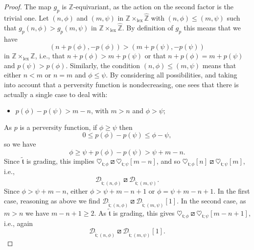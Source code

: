 \documentclass{article}
\newtheorem{prop}[thm]{Proposition}
\theoremstyle{definition}
\newcommand{\Z}{\mathbb{Z}}
\newcommand{\tee}{\mathfrak{t}}
\newcommand{\orth}{\boxslash}
\begin{document}
\begin{proof}
The map $g_p$ is $\Z$-equivariant, as the action on the second factor is the trivial one.  Let $(n,\phi)$ and $(m,\psi)$ in $\Z\times_{\mathrm{lex}} \hat{\Z}$ with $(n,\phi)\leq (m,\psi)$ such that $g_p(n,\phi)>g_p(m,\psi)$ in $\Z\times_{\mathrm{lex}} \hat{\Z}$. By definition of $g_p$ this means that we have
\[
(n+p(\phi),-p(\phi))>(m+p(\psi),-p(\psi))
\]
in $\Z\times_{\mathrm{lex}} \Z$, i.e., that $n+p(\phi)>m+p(\psi)$ or that $n+p(\phi)=m+p(\psi)$ and $p(\psi)>p(\phi)$. Similarly, the condition $(n,\phi)\leq (m,\psi)$ means that either $n<m$ or $n=m$ and $\phi\leq \psi$. By considering all possibilities, and taking into account that a perversity function is nondecreasing, one sees that there is actually a single case to deal with:
\begin{itemize}
\item $p(\phi)-p(\psi)>m-n$, with $m>n$ and $\phi>\psi$;
\end{itemize}
As $p$ is a perversity function, if $\phi\geq \psi$ then
\[
0\leq p(\phi)-p(\psi)\leq \phi-\psi,
\]
so we have
\[
\phi\geq \psi+ p(\phi)-p(\psi)>\psi+m-n.
\]
Since $\tilde{\tee}$ is grading, this implies $\heartsuit_{\tee;\phi}\orth\heartsuit_{\tee;\psi}[m-n]$, and so $\heartsuit_{\tee;\phi}[n]\orth \heartsuit_{\tee;\psi}[m]$, i.e.,
\[
\mathscr{D}_{\tilde{\tee};(n,\phi)}\orth\mathscr{D}_{\tilde{\tee};(m,\psi)}.
\]
Since $\phi>\psi+m-n$, either $\phi>\psi+m-n+1$ or $\phi=\psi+m-n+1$. In the first case, reasoning as above we find $\mathscr{D}_{\tilde{\tee};(n,\phi)}\orth\mathscr{D}_{\tilde{\tee};(m,\psi)}[1]$. In the second case, as $m>n$ we have $m-n+1\geq 2$. As $\tilde{\tee}$ is grading, this gives $\heartsuit_{\tee;\phi}\orth\heartsuit_{\tee;\psi}[m-n+1]$, i.e., again
\[
\mathscr{D}_{\tilde{\tee};(n,\phi)}\orth\mathscr{D}_{\tilde{\tee};(m,\psi)}[1].
\]
\end{proof}

\end{document}
